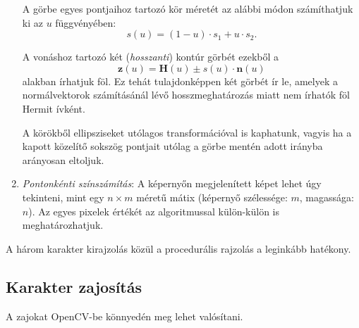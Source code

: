 \begin{enumerate}
A görbe egyes pontjaihoz tartozó kör méretét az alábbi módon számíthatjuk ki az $u$ függvényében:
$$
s(u) = (1 - u) \cdot s_1 + u \cdot s_2.
$$

A vonáshoz tartozó két (\textit{hosszanti}) kontúr görbét ezekből a
$$
\textbf{z}(u) = \textbf{H}(u) \pm s(u) \cdot \textbf{n}(u)
$$
alakban írhatjuk föl. Ez tehát tulajdonképpen két görbét ír le, amelyek a normálvektorok számításánál lévő hosszmeghatározás miatt nem írhatók föl Hermit ívként.

A körökből ellipsziseket utólagos transformációval is kaphatunk, vagyis ha a kapott közelítő sokszög pontjait utólag a görbe mentén adott irányba arányosan eltoljuk.

\item \textit{Pontonkénti színszámítás}: A képernyőn megjelenített képet lehet úgy tekinteni, mint egy $n \times m$ méretű mátix (képernyő szélessége: $m$, magassága: $n$). Az egyes pixelek értékét az algoritmussal külön-külön is meghatározhatjuk.

\end{enumerate}

A három karakter kirajzolás közül a procedurális rajzolás a leginkább hatékony.

\subsection{Karakter zajosítás \cite{WANG1973303}}

A zajokat OpenCV-be \cite{OpenCVli86} könnyedén meg lehet valósítani.

